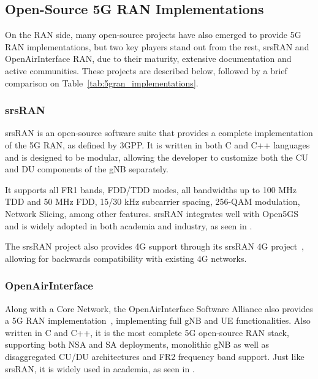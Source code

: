 \subsection{Open-Source 5G RAN Implementations}
\label{sec:open_source_5g_ran_implementations}
On the \gls{RAN} side, many open-source projects have also emerged to provide 5G \gls{RAN} implementations, but two key players stand out from the rest, srsRAN and OpenAirInterface \gls{RAN}, due to their maturity, extensive documentation and active communities. These projects are described below, followed by a brief comparison on Table~\ref{tab:5gran_implementations}.
\subsubsection{srsRAN}
\label{sec:srsran}

srsRAN \cite{srsran_project} is an open-source software suite that provides a complete implementation of the 5G \gls{RAN}, as defined by \gls{3GPP}. It is written in both C and C++ languages and is designed to be modular, allowing the developer to customize both the \gls{CU} and \gls{DU} components of the \gls{gNB} separately. 

It supports all FR1 bands, FDD/TDD modes, all bandwidths up to 100 MHz TDD and 50 MHz FDD, 15/30 kHz subcarrier spacing, 256-QAM modulation, Network Slicing, among other features. srsRAN integrates well with Open5GS and is widely adopted in both academia and industry, as seen in \cites{horstmann2025open5gcube}{mamushiane2023deploying}{tio2025exploring5g}{vazquez2024maq5g}.

The srsRAN project also provides 4G  support through its srsRAN 4G project~\cite{srsran_4g_repo}, allowing for backwards compatibility with existing 4G networks.
\subsubsection{OpenAirInterface}
\label{sec:openairinterface_ran}

Along with a Core Network, the OpenAirInterface Software Alliance also provides a 5G RAN implementation~\cite{oai5g_repo}, implementing full \gls{gNB} and \gls{UE} functionalities. Also written in C and C++, it is the most complete 5G open-source RAN stack, supporting both \gls{NSA} and \gls{SA} deployments, monolithic \gls{gNB} as well as disaggregated \gls{CU}/\gls{DU} architectures and FR2 frequency band support. Just like srsRAN, it is widely used in academia, as seen in \cites{bonati2025_5gct}{horstmann2025open5gcube}.

